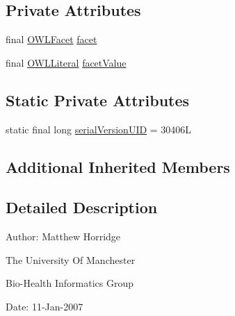 \subsection*{Private Attributes}
\begin{DoxyCompactItemize}
\item 
final \hyperlink{enumorg_1_1semanticweb_1_1owlapi_1_1vocab_1_1_o_w_l_facet}{O\-W\-L\-Facet} \hyperlink{classuk_1_1ac_1_1manchester_1_1cs_1_1owl_1_1owlapi_1_1_o_w_l_facet_restriction_impl_a43b4dbe8b964fd6287e66fcb121da81c}{facet}
\item 
final \hyperlink{interfaceorg_1_1semanticweb_1_1owlapi_1_1model_1_1_o_w_l_literal}{O\-W\-L\-Literal} \hyperlink{classuk_1_1ac_1_1manchester_1_1cs_1_1owl_1_1owlapi_1_1_o_w_l_facet_restriction_impl_afebbfcf54a2932258f5860a01ca5fa3b}{facet\-Value}
\end{DoxyCompactItemize}
\subsection*{Static Private Attributes}
\begin{DoxyCompactItemize}
\item 
static final long \hyperlink{classuk_1_1ac_1_1manchester_1_1cs_1_1owl_1_1owlapi_1_1_o_w_l_facet_restriction_impl_a775dcb3d9607feaabe149e777c1998fc}{serial\-Version\-U\-I\-D} = 30406\-L
\end{DoxyCompactItemize}
\subsection*{Additional Inherited Members}


\subsection{Detailed Description}
Author\-: Matthew Horridge\par
 The University Of Manchester\par
 Bio-\/\-Health Informatics Group\par
 Date\-: 11-\/\-Jan-\/2007\par
 \par
 


